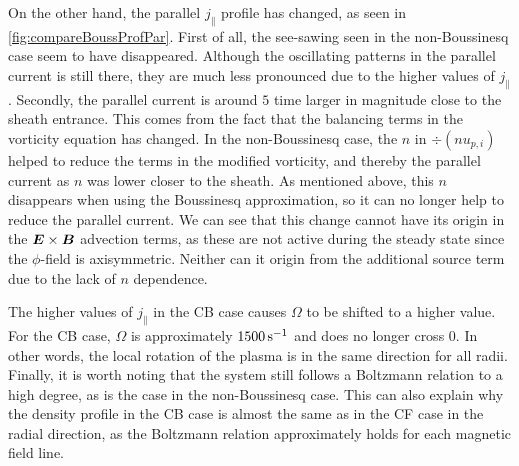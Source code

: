 On the other hand, the parallel $j_\|$ profile has changed, as seen in \cref{fig:compareBoussProfPar}.
First of all, the see-sawing seen in the non-Boussinesq case seem to have disappeared.
Although the oscillating patterns in the parallel current is still there, they are much less pronounced due to the higher values of $j_\|$.
Secondly, the parallel current is around $5$ time larger in magnitude close to the sheath entrance.
This comes from the fact that the balancing terms in the vorticity equation has changed.
In the non-Boussinesq case, the $n$ in $\div(nu_{p,i})$ helped to reduce the terms in the modified vorticity, and thereby the parallel current as $n$ was lower closer to the sheath.
As mentioned above, this $n$ disappears when using the Boussinesq approximation, so it can no longer help to reduce the parallel current.
We can see that this change cannot have its origin in the $\boldsymbol{E}\times\boldsymbol{B}$ advection terms, as these are not active during the steady state since the $\phi$-field is axisymmetric.
Neither can it origin from the additional source term due to the lack of $n$ dependence.

The higher values of $j_\|$ in the CB case causes $\Omega$ to be shifted to a higher value.
For the CB case, $\Omega$ is approximately $1500 \, \text{s}^{-1}$ and does no longer cross $0$.
In other words, the local rotation of the plasma is in the same direction for all radii.
Finally, it is worth noting that the system still follows a Boltzmann relation to a high degree, as is the case in the non-Boussinesq case.
This can also explain why the density profile in the CB case is almost the same as in the CF case in the radial direction, as the Boltzmann relation approximately holds for each magnetic field line.
%

